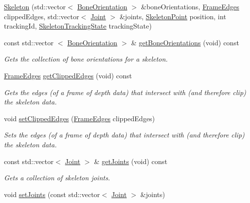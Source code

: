 \begin{DoxyCompactItemize}
\item 
\hyperlink{class_skeleton_a4639e5b560a45da3f4c4ca73759499fa}{\-Skeleton} (std\-::vector$<$ \hyperlink{class_bone_orientation}{\-Bone\-Orientation} $>$ \&bone\-Orientations, \hyperlink{frame_edges_8h_a8d8e7a6cfaeb00386411494d5d9a23a0}{\-Frame\-Edges} clipped\-Edges, std\-::vector$<$ \hyperlink{class_joint}{\-Joint} $>$ \&joints, \hyperlink{class_skeleton_point}{\-Skeleton\-Point} position, int tracking\-Id, \hyperlink{skeleton_tracking_state_8h_a970dd6d8f4fed3a223e0ae2dca36435c}{\-Skeleton\-Tracking\-State} tracking\-State)
\item 
const std\-::vector\*
$<$ \hyperlink{class_bone_orientation}{\-Bone\-Orientation} $>$ \& \hyperlink{class_skeleton_a700f66248954f988296f5a55754ae014}{get\-Bone\-Orientations} (void) const 
\begin{DoxyCompactList}\small\item\em \-Gets the collection of bone orientations for a skeleton. \end{DoxyCompactList}\item 
\hyperlink{frame_edges_8h_a8d8e7a6cfaeb00386411494d5d9a23a0}{\-Frame\-Edges} \hyperlink{class_skeleton_a5bd06b73dd54b7dfb136b385461c671a}{get\-Clipped\-Edges} (void) const 
\begin{DoxyCompactList}\small\item\em \-Gets the edges (of a frame of depth data) that intersect with (and therefore clip) the skeleton data. \end{DoxyCompactList}\item 
void \hyperlink{class_skeleton_a5ed1d23671bf355818bd3628b2105fec}{set\-Clipped\-Edges} (\hyperlink{frame_edges_8h_a8d8e7a6cfaeb00386411494d5d9a23a0}{\-Frame\-Edges} clipped\-Edges)
\begin{DoxyCompactList}\small\item\em \-Sets the edges (of a frame of depth data) that intersect with (and therefore clip) the skeleton data. \end{DoxyCompactList}\item 
const std\-::vector$<$ \hyperlink{class_joint}{\-Joint} $>$ \& \hyperlink{class_skeleton_a09de0e2d82ad94a62af0373fff583d64}{get\-Joints} (void) const 
\begin{DoxyCompactList}\small\item\em \-Gets a collection of skeleton joints. \end{DoxyCompactList}\item 
void \hyperlink{class_skeleton_a0aa2f000e4a4ebc72eb1b8035e895641}{set\-Joints} (const std\-::vector$<$ \hyperlink{class_joint}{\-Joint} $>$ \&joints)

\end{DoxyCompactItemize}
